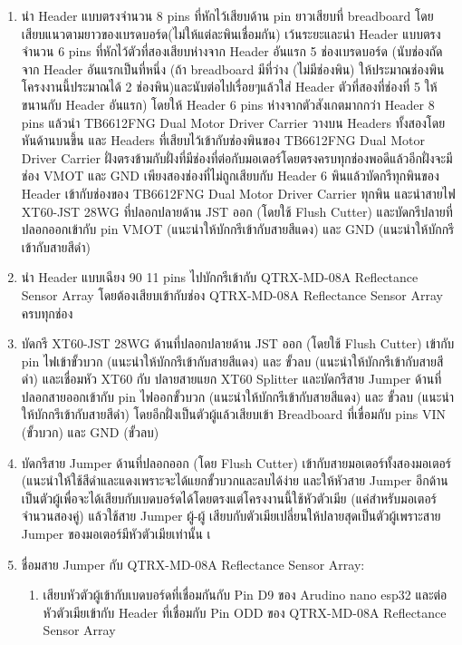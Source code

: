 \documentclass[14pt, fleqn, a4paper]{extarticle}
\begin{document}
\begin{enumerate}
\begin{enumerate}
\begin{enumerate}
			\item นำ Header แบบตรงจำนวน 8 pins ที่หักไว้เสียบด้าน pin ยาวเสียบที่ breadboard โดยเสียบแนวตามยาวของเบรดบอร์ด(ไม่ให้แต่ละพินเชื่อมกัน) เว้นระยะและนำ Header แบบตรงจำนวน 6 pins ที่หักไว้ตัวที่สองเสียบห่างจาก Header อันแรก 5 ช่องเบรดบอร์ด (นับช่องถัดจาก Header อันแรกเป็นที่หนึ่ง (ถ้า breadboard มีที่ว่าง (ไม่มีช่องพิน) ให้ประมาณช่องพินโครงงานนี้ประมาณได้ 2 ช่องพิน)และนับต่อไปเรื่อยๆแล้วใส่ Header ตัวที่สองที่ช่องที่ 5 ให้ขนานกับ Header อันแรก) โดยให้ Header 6 pins ห่างจากตัวสังเกตมากกว่า Header 8 pins แล้วนำ TB6612FNG Dual Motor Driver Carrier วางบน Headers ทั้งสองโดยหันด้านบนขึ้น และ Headers ที่เสียบไว้เข้ากับช่องพินของ TB6612FNG Dual Motor Driver Carrier ฝั่งตรงข้ามกับฝั่งที่มีช่องที่ต่อกับมอเตอร์โดยตรงครบทุกช่องพอดีแล้วอีกฝั่งจะมีช่อง VMOT และ GND เพียงสองช่องที่ไม่ถูกเสียบกับ Header 6 พินแล้วบัดกรีทุกพินของ Header เข้ากับช่องของ TB6612FNG Dual Motor Driver Carrier ทุกพิน และนำสายไฟ XT60-JST 28WG ที่ปลอกปลายด้าน JST ออก (โดยใช้ Flush Cutter) และบัดกรีปลายที่ปลอกออกเข้ากับ pin VMOT (แนะนำให้บักกรีเข้ากับสายสีแดง) และ GND (แนะนำให้บักกรีเข้ากับสายสีดำ)
			\item นำ Header แบบเฉียง 90 11 pins ไปบักกรีเข้ากับ QTRX-MD-08A Reflectance Sensor Array โดยต้องเสียบเข้ากับช่อง QTRX-MD-08A Reflectance Sensor Array ครบทุกช่อง
			\item บัดกรี XT60-JST 28WG ด้านที่ปลอกปลายด้าน JST ออก (โดยใช้ Flush Cutter) เข้ากับ pin ไฟเข้าขั้วบวก (แนะนำให้บักกรีเข้ากับสายสีแดง) และ ขั้วลบ (แนะนำให้บักกรีเข้ากับสายสีดำ) และเชื่อมหัว XT60 กับ ปลายสายแยก XT60 Splitter และบัดกรีสาย Jumper ด้านที่ปลอกสายออกเข้ากับ pin ไฟออกขั้วบวก (แนะนำให้บักกรีเข้ากับสายสีแดง) และ ขั้วลบ (แนะนำให้บักกรีเข้ากับสายสีดำ) โดยอีกฝั่งเป็นตัวผู้แล้วเสียบเข้า Breadboard ที่เขื่อมกับ pins VIN (ขั้วบวก) และ GND (ขั้วลบ)
			\item บัดกรีสาย Jumper ด้านที่ปลอกออก (โดย Flush Cutter) เข้ากับสายมอเตอร์ทั้งสองมอเตอร์ (แนะนำให้ใช้สีดำและแดงเพราะจะได้แยกขั้วบวกและลบได้ง่าย และให้หัวสาย Jumper อีกด้านเป็นตัวผู้เพื่อจะได้เสียบกับเบดบอร์ดได้โดยตรงแต่โครงงานนี้ใช้หัวตัวเมีย (แค่สำหรับมอเตอร์จำนวนสองคู่) แล้วใช้สาย Jumper ผู้-ผู้ เสียบกับตัวเมียเปลี่ยนให้ปลายสุดเป็นตัวผู้เพราะสาย Jumper ของมอเตอร์มีหัวตัวเมียเท่านั้น
เ			\item ชื่อมสาย Jumper กับ QTRX-MD-08A Reflectance Sensor Array:
				\begin{enumerate}
					\item เสียบหัวตัวผู้เข้ากับเบดบอร์ดที่เชื่อมกันกับ Pin D9 ของ Arudino nano esp32 และต่อหัวตัวเมียเข้ากับ Header ที่เชื่อมกับ Pin ODD ของ QTRX-MD-08A Reflectance Sensor Array

\end{enumerate}
\end{enumerate}
\end{enumerate}
\end{enumerate}
\end{document}
